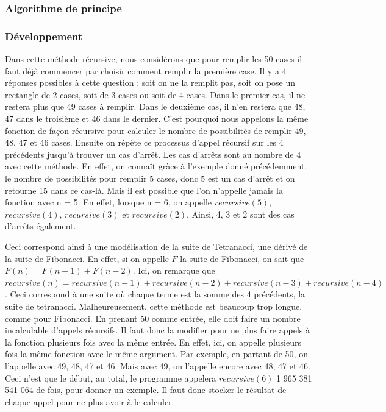 \documentclass{article}
\begin{document}
\subsubsection{Algorithme de principe}


\subsubsection{Développement}
Dans cette méthode récursive, nous considérons que pour remplir les 50 cases il faut déjà commencer par choisir comment remplir la première case. Il y a 4 réponses possibles à cette question : soit on ne la remplit pas, soit on pose un rectangle de 2 cases, soit de 3 cases ou soit de 4 cases. Dans le premier cas, il ne restera plus que 49 cases à remplir. Dans le deuxième cas, il n'en restera que 48, 47 dans le troisième et 46 dans le dernier. C'est pourquoi nous appelons la même fonction de façon récursive pour calculer le nombre de possibilités de remplir 49, 48, 47 et 46 cases. Ensuite on répète ce processus d'appel récursif sur les 4 précédents jusqu'à trouver un cas d'arrêt. Les cas d'arrêts sont au nombre de 4 avec cette méthode. En effet, on connaît gràce à l'exemple donné précédemment, le nombre de possibilités pour remplir 5 cases, donc 5 est un cas d'arrêt et on retourne 15 dans ce cas-là. Mais il est possible que l'on n'appelle jamais la fonction avec n = 5. En effet, lorsque n = 6, on appelle $recursive(5)$, $recursive(4)$, $recursive(3)$ et $recursive(2)$. Ainsi, 4, 3 et 2 sont des cas d'arrêts également.

Ceci correspond ainsi à une modélisation de la suite de Tetranacci, une dérivé de la suite de Fibonacci. En effet, si on appelle $F$ la suite de Fibonacci, on sait que $F(n) = F(n-1) + F(n-2)$. Ici, on remarque que $recursive(n) = recursive(n-1) + recursive(n-2) + recursive(n-3) + recursive(n-4)$. Ceci correspond à une suite où chaque terme est la somme des 4 précédents, la suite de tetranacci. Malheureusement, cette méthode est beaucoup trop longue, comme pour Fibonacci. En prenant 50 comme entrée, elle doit faire un nombre incalculable d'appels récursifs. Il faut donc la modifier pour ne plus faire appels à la fonction plusieurs fois avec la même entrée. En effet, ici, on appelle plusieurs fois la même fonction avec le même argument. Par exemple, en partant de 50, on l'appelle avec 49, 48, 47 et 46. Mais avec 49, on l'appelle encore avec 48, 47 et 46. Ceci n'est que le début, au total, le programme appelera $recursive(6)$ 1 965 381 541 064 de fois, pour donner un exemple. Il faut donc stocker le résultat de chaque appel pour ne plus avoir à le calculer.
\end{document}
